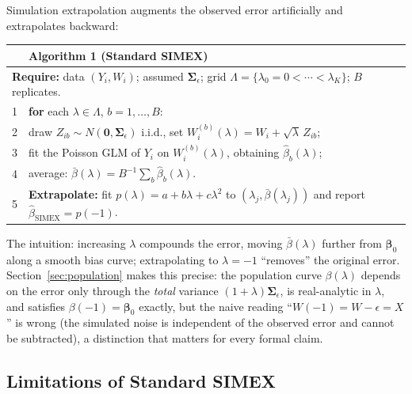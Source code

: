 \documentclass[3p,11pt]{elsarticle}
\theoremstyle{plain}
\theoremstyle{definition}
\newcommand{\bet}{\bm{\beta}}
\newcommand{\bSig}{\bm{\Sigma}}
\begin{document}
Simulation extrapolation \citep{cook1994} augments the observed error
artificially and extrapolates backward:

\begin{center}
\small
\begin{tabular}{ll}
\toprule
& \textbf{Algorithm 1 (Standard SIMEX)}\\
\midrule
\multicolumn{2}{l}{\textbf{Require:} data $(Y_i,W_i)$; assumed
$\bSig_\epsilon$; grid $\Lambda=\{\lambda_0=0<\cdots<\lambda_K\}$;
$B$ replicates.}\\
1 & \textbf{for} each $\lambda\in\Lambda$, $b=1,\dots,B$:\\
2 & \quad draw $Z_{ib}\sim N(\bm 0,\bSig_\epsilon)$ i.i.d., set
$W_i^{(b)}(\lambda)=W_i+\sqrt{\lambda}\,Z_{ib}$;\\
3 & \quad fit the Poisson GLM of $Y_i$ on
$W_i^{(b)}(\lambda)$, obtaining $\hat\beta_b(\lambda)$;\\
4 & \quad average: $\bar\beta(\lambda)=B^{-1}\sum_b\hat\beta_b(\lambda)$.\\
5 & \textbf{Extrapolate:} fit $p(\lambda)=a+b\lambda+c\lambda^2$ to
$(\lambda_j,\bar\beta(\lambda_j))$ and report
$\hat\beta_{\mathrm{SIMEX}}=p(-1)$.\\
\bottomrule
\end{tabular}
\end{center}

The intuition: increasing $\lambda$ compounds the error, moving
$\bar\beta(\lambda)$ further from $\bet_0$ along a smooth bias curve;
extrapolating to $\lambda=-1$ ``removes'' the original error.
Section~\ref{sec:population} makes this precise: the population curve
$\beta(\lambda)$ depends on the error only through the \emph{total}
variance $(1+\lambda)\bSig_\epsilon$, is real-analytic in $\lambda$,
and satisfies $\beta(-1)=\bet_0$ exactly, but the naive reading
``$W(-1)=W-\epsilon=X$'' is wrong (the simulated noise is independent
of the observed error and cannot be subtracted), a distinction that
matters for every formal claim.

\subsection{Limitations of Standard SIMEX}\label{sec:limitations}
\end{document}
